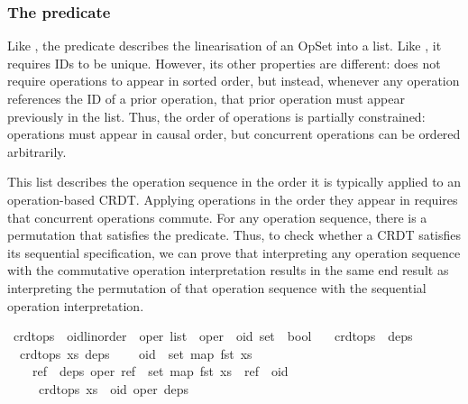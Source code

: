 \subsubsection{The  predicate}

Like , the  predicate describes the linearisation of an OpSet into a list.
Like , it requires IDs to be unique.
However, its other properties are different:  does not require operations to appear in sorted order, but instead, whenever any operation references the ID of a prior operation, that prior operation must appear previously in the  list.
Thus, the order of operations is partially constrained: operations must appear in causal order, but concurrent operations can be ordered arbitrarily.

This list describes the operation sequence in the order it is typically applied to an operation-based CRDT.
Applying operations in the order they appear in  requires that concurrent operations commute.
For any  operation sequence, there is a permutation that satisfies the  predicate.
Thus, to check whether a CRDT satisfies its sequential specification, we can prove that interpreting any  operation sequence with the commutative operation interpretation results in the same end result as interpreting the  permutation of that operation sequence with the sequential operation interpretation.

\begin{isabelle}
\isamarkupfalse%
\ crdt{\isacharunderscore}ops\ {\isacharcolon}{\isacharcolon}\ {\isachardoublequoteopen}{\isacharparenleft}{\isacharprime}oid{\isacharcolon}{\isacharcolon}{\isacharbraceleft}linorder{\isacharbraceright}\ {\isasymtimes}\ {\isacharprime}oper{\isacharparenright}\ list\ {\isasymRightarrow}\ {\isacharparenleft}{\isacharprime}oper\ {\isasymRightarrow}\ {\isacharprime}oid\ set{\isacharparenright}\ {\isasymRightarrow}\ bool{\isachardoublequoteclose}\ \isanewline
\ \ {\isachardoublequoteopen}crdt{\isacharunderscore}ops\ {\isacharbrackleft}{\isacharbrackright}\ deps{\isachardoublequoteclose}\ {\isacharbar}\isanewline
\ \ {\isachardoublequoteopen}{\isasymlbrakk}crdt{\isacharunderscore}ops\ xs\ deps{\isacharsemicolon}\isanewline
\ \ \ \ oid\ {\isasymnotin}\ set\ {\isacharparenleft}map\ fst\ xs{\isacharparenright}{\isacharsemicolon}\isanewline
\ \ \ \ {\isasymforall}ref\ {\isasymin}\ deps\ oper{\isachardot}\ ref\ {\isasymin}\ set\ {\isacharparenleft}map\ fst\ xs{\isacharparenright}\ {\isasymand}\ ref\ {\isacharless}\ oid\isanewline
\ \ \ {\isasymrbrakk}\ {\isasymLongrightarrow}\ crdt{\isacharunderscore}ops\ {\isacharparenleft}xs\ {\isacharat}\ {\isacharbrackleft}{\isacharparenleft}oid{\isacharcomma}\ oper{\isacharparenright}{\isacharbrackright}{\isacharparenright}\ deps{\isachardoublequoteclose}
\end{isabelle}



